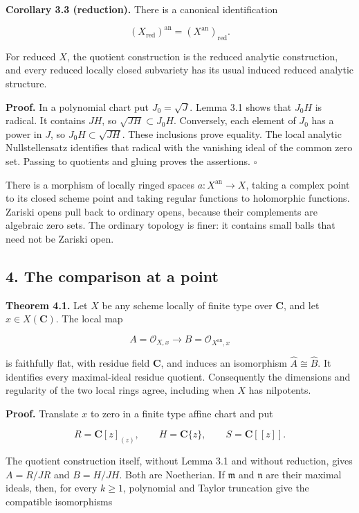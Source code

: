 \documentclass[11pt]{article}
\begin{document}
\textbf{Corollary 3.3 (reduction).} There is a canonical identification

\[
(X_{\mathrm{red}})^{\mathrm{an}}=(X^{\mathrm{an}})_{\mathrm{red}}.
\]

For reduced \(X\), the quotient construction is the reduced analytic
construction, and every reduced locally closed subvariety has its usual
induced reduced analytic structure.

\textbf{Proof.} In a polynomial chart put \(J_0=\sqrt J\). Lemma 3.1
shows that \(J_0H\) is radical. It contains \(JH\), so
\(\sqrt{JH}\subset J_0H\). Conversely, each element of \(J_0\) has a
power in \(J\), so \(J_0H\subset\sqrt{JH}\). These inclusions prove
equality. The local analytic Nullstellensatz identifies that radical
with the vanishing ideal of the common zero set. Passing to quotients
and gluing proves the assertions. \(\square\)

There is a morphism of locally ringed spaces \(a:X^{\mathrm{an}}\to X\),
taking a complex point to its closed scheme point and taking regular
functions to holomorphic functions. Zariski opens pull back to ordinary
opens, because their complements are algebraic zero sets. The ordinary
topology is finer: it contains small balls that need not be Zariski
open.

\subsection{4. The comparison at a
point}\label{the-comparison-at-a-point}

\textbf{Theorem 4.1.} Let \(X\) be any scheme locally of finite type
over \(\mathbf C\), and let \(x\in X(\mathbf C)\). The local map

\[
A=\mathcal O_{X,x}\longrightarrow B=\mathcal O_{X^{\mathrm{an}},x}
\]

is faithfully flat, with residue field \(\mathbf C\), and induces an
isomorphism \(\widehat A\cong\widehat B\). It identifies every
maximal-ideal residue quotient. Consequently the dimensions and
regularity of the two local rings agree, including when \(X\) has
nilpotents.

\textbf{Proof.} Translate \(x\) to zero in a finite type affine chart
and put

\[
R=\mathbf C[z]_{(z)},\qquad H=\mathbf C\{z\},\qquad
S=\mathbf C[[z]].
\]

The quotient construction itself, without Lemma 3.1 and without
reduction, gives \(A=R/JR\) and \(B=H/JH\). Both are Noetherian. If
\(\mathfrak m\) and \(\mathfrak n\) are their maximal ideals, then, for
every \(k\geq1\), polynomial and Taylor truncation give the compatible
isomorphisms
\end{document}

